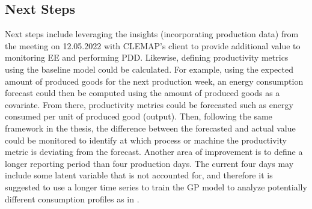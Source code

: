 \subsection{Next Steps}

Next steps include leveraging the insights (incorporating production data) from the meeting on 12.05.2022 with CLEMAP's client to provide additional value to monitoring EE and performing PDD. Likewise, defining productivity metrics using the baseline model could be calculated. For example, using the expected amount of produced goods for the next production week, an energy consumption forecast could then be computed using the amount of produced goods as a covariate. From there, productivity metrics could be forecasted such as energy consumed per unit of produced good (output). Then, following the same framework in the thesis, the difference between the forecasted and actual value could be monitored to identify at which process or machine the productivity metric is deviating from the forecast. Another area of improvement is to define a longer reporting period than four production days. The current four days may include some latent variable that is not accounted for, and therefore it is suggested to use a longer time series to train the GP model to analyze potentially different consumption profiles as in \cite{cas}. 


